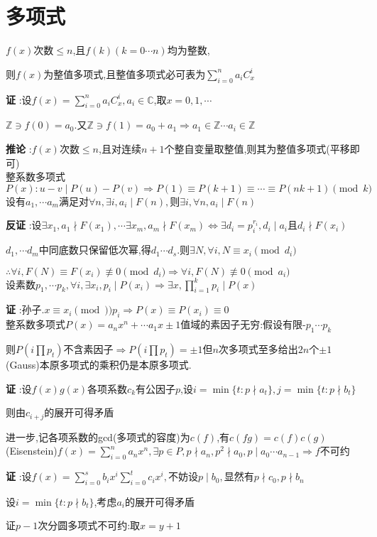 \section{多项式}
$ f(x)$次数$ \le n$,且$ f(k)(k=0\cdots n)$均为整数,

则$ f(x)$为整值多项式,且整值多项式必可表为$ \sum_{i=0}^{n}{a_iC_x^i}$

{\bf 证 }:设$ f(x)=\sum_{i=0}^{n}{a_iC_x^i},a_i \in \mathbb{C}$,取$ x=0,1,\cdots$

$ \mathbb{Z}\ni f(0)=a_0$.又$ \mathbb{Z}\ni f(1)=a_0+a_1\Rightarrow a_1\in \mathbb{Z}\cdots a_i\in \mathbb{Z}$

{\bf 推论 }:$ f(x)$次数$ \le n$,且对连续$ n+1$个整自变量取整值,则其为整值多项式(平移即可)
\\

整系数多项式$ P(x):u-v \mid P(u)-P(v)\Rightarrow P(1)\equiv P(k+1) \equiv \cdots \equiv P(nk+1) \pmod k$
\\

设有$ a_1,\cdots a_m$满足对$ \forall n,\exists i,a_i\mid F(n),$则$ \exists i,\forall n,a_i\mid F(n)$

{\bf 反证 }:设$ \exists x_1, a_1 \nmid F(x_1),\cdots \exists x_m, a_m \nmid F(x_m)
\Leftrightarrow \exists d_i=p_i^{r_i},d_i \mid a_i$且$ d_i\nmid F(x_i)$

$ d_1,\cdots d_m$中同底数只保留低次幂,得$ d_1\cdots d_s.$则$ \exists N ,\forall i,N\equiv x_i \pmod{d_i}$

$ \therefore \forall i,F(N)\equiv F(x_i)\not\equiv 0 \pmod{d_i}\Rightarrow \forall i,F(N)\not\equiv 0 \pmod{a_i}$
\\

设素数$ p_1,\cdots p_k,\forall i ,\exists x_i,p_i \mid P(x_i)\Rightarrow \exists x ,\prod_{i=1}^{k}{p_i}\mid P(x)$

{\bf 证 }:孙子.$ x\equiv x_i \pmod)p_i\Rightarrow P(x)\equiv P(x_i)\equiv 0$
\\

整系数多项式$ P(x)=a_nx^n+\cdots a_1x\pm1$值域的素因子无穷:假设有限-$ p_1\cdots p_k$

则$ P(i\prod{p_t})$不含素因子$ \Rightarrow P(i\prod{p_t})=\pm 1$但$ n$次多项式至多给出$ 2n$个$ \pm 1$
\\

(Gauss)本原多项式的乘积仍是本原多项式.

{\bf 证 }:设$ f(x)g(x)$各项系数$ c_k$有公因子$ p$,设$ i=\min\{t: p \nmid a_t\},j=\min\{t: p\nmid b_t\}$

则由$ c_{i+j}$的展开可得矛盾

进一步,记各项系数的gcd(多项式的容度)为$ c(f)$,有$ c(fg)=c(f)c(g)$
\\

(Eisenstein)$ f(x)=\sum_{i=0}^{n}{a_nx^n},\exists p\in P,p \nmid a_n,p^2\nmid a_0,p \mid a_0\cdots a_{n-1}\Rightarrow f$不可约

{\bf 证 }:设$ f(x)=\sum_{i=0}^{s}{b_ix^i}\sum_{i=0}^{t}{c_ix^i},$不妨设$ p \mid b_0,$显然有$ p\nmid c_0,p\nmid b_n$

设$ i=\min\{ t:p\nmid b_t\}$,考虑$ a_i$的展开可得矛盾

证$ p-1$次分圆多项式不可约:取$ x=y+1$
